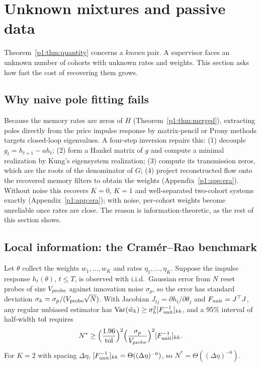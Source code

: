 \section{Unknown mixtures and passive data}\label{p1:sec:mixtures}

Theorem~\ref{p1:thm:quantity} concerns a \emph{known} pair. A supervisor faces an unknown number of cohorts with unknown rates and weights. This section asks how fast the cost of recovering them grows.

\subsection{Why naive pole fitting fails}

Because the memory rates are zeros of $H$ (Theorem~\ref{p1:thm:merged}), extracting poles directly from the price impulse response by matrix-pencil or Prony methods targets closed-loop eigenvalues. A four-step inversion repairs this: (1) decouple $g_t=h_{t+1}-ah_t$; (2) form a Hankel matrix of $g$ and compute a minimal realization by Kung's eigensystem realization; (3) compute its transmission zeros, which are the roots of the denominator of $G$; (4) project reconstructed flow onto the recovered memory filters to obtain the weights (Appendix~\ref{p1:app:era}). Without noise this recovers $K=0$, $K=1$ and well-separated two-cohort systems exactly (Appendix~\ref{p1:app:era}); with noise, per-cohort weights become unreliable once rates are close. The reason is information-theoretic, as the rest of this section shows.

\subsection{Local information: the Cram\'er--Rao benchmark}

\begin{proposition}\label{p1:prop:crb}
Let $\theta$ collect the weights $w_1,\ldots,w_K$ and rates $\eta_1,\ldots,\eta_K$. Suppose the impulse response $h_t(\theta)$, $t\le T$, is observed with i.i.d.\ Gaussian error from $N$ reset probes of size $V_{\rm probe}$ against innovation noise $\sigma_p$, so the error has standard deviation $\sigma_h=\sigma_p/(V_{\rm probe}\sqrt N)$. With Jacobian $J_{tj}=\partial h_t/\partial\theta_j$ and $F_{\rm unit}=J^\top J$, any regular unbiased estimator has ${\rm Var}(\hat w_k)\ge\sigma_h^2[F_{\rm unit}^{-1}]_{kk}$, and a 95\% interval of half-width ${\rm tol}$ requires
\begin{equation}\label{p1:eq:Ncrb}
N^*\ge\Bigl(\frac{1.96}{\rm tol}\Bigr)^2\Bigl(\frac{\sigma_p}{V_{\rm probe}}\Bigr)^2[F_{\rm unit}^{-1}]_{kk}.
\end{equation}
For $K=2$ with spacing $\Delta\eta$, $[F_{\rm unit}^{-1}]_{kk}=\Theta((\Delta\eta)^{-6})$, so $N^*=\Theta((\Delta\eta)^{-6})$.
\end{proposition}

